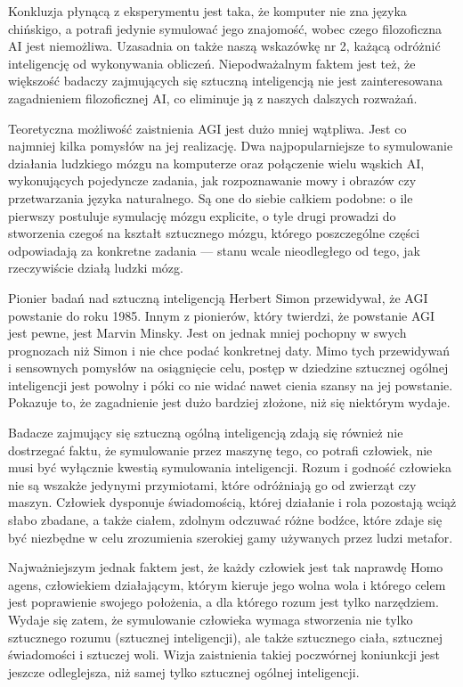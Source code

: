 \documentclass[10pt,a4paper]{article}
\begin{document}
	\par Konkluzja płynącą z eksperymentu jest taka, że komputer nie zna języka chińskigo, a potrafi jedynie symulować jego znajomość, wobec czego filozoficzna AI jest niemożliwa. Uzasadnia on także naszą wskazówkę nr 2, każącą odróżnić inteligencję od wykonywania obliczeń. Niepodważalnym faktem jest też, że większość badaczy zajmujących się sztuczną inteligencją nie jest zainteresowana zagadnieniem filozoficznej AI, co eliminuje ją z naszych dalszych rozważań.
	\par Teoretyczna możliwość zaistnienia AGI jest dużo mniej wątpliwa. Jest co najmniej kilka pomysłów na jej realizację. Dwa najpopularniejsze to symulowanie działania ludzkiego mózgu na komputerze oraz połączenie wielu wąskich AI, wykonujących pojedyncze zadania, jak rozpoznawanie mowy i obrazów czy przetwarzania języka naturalnego. Są one do siebie całkiem podobne: o ile pierwszy postuluje symulację mózgu explicite, o tyle drugi prowadzi do stworzenia czegoś na kształt sztucznego mózgu, którego poszczególne części odpowiadają za konkretne zadania — stanu wcale nieodległego od tego, jak rzeczywiście działą ludzki mózg.
	\par Pionier badań nad sztuczną inteligencją Herbert Simon przewidywał, że AGI powstanie do roku 1985. Innym z pionierów, który twierdzi, że powstanie AGI jest pewne, jest Marvin Minsky. Jest on jednak mniej pochopny w swych prognozach niż Simon i nie chce podać konkretnej daty. Mimo tych przewidywań i sensownych pomysłów na osiągnięcie celu, postęp w dziedzine sztucznej ogólnej inteligencji jest powolny i póki co nie widać nawet cienia szansy na jej powstanie. Pokazuje to, że zagadnienie jest dużo bardziej złożone, niż się niektórym wydaje.
	\par Badacze zajmujący się sztuczną ogólną inteligencją zdają się również nie dostrzegać faktu, że symulowanie przez maszynę tego, co potrafi człowiek, nie musi być wyłącznie kwestią symulowania inteligencji. Rozum i godność człowieka nie są wszakże jedynymi przymiotami, które odróżniają go od zwierząt czy maszyn. Człowiek dysponuje świadomością, której działanie i rola pozostają wciąż słabo zbadane, a także ciałem, zdolnym odczuwać różne bodźce, które zdaje się być niezbędne w celu zrozumienia szerokiej gamy używanych przez ludzi metafor.
	\par Najważniejszym jednak faktem jest, że każdy człowiek jest tak naprawdę Homo agens, człowiekiem działającym, którym kieruje jego wolna wola i którego celem jest poprawienie swojego położenia, a dla którego rozum jest tylko narzędziem. Wydaje się zatem, że symulowanie człowieka wymaga stworzenia nie tylko sztucznego rozumu (sztucznej inteligencji), ale także sztucznego ciała, sztucznej świadomości i sztuczej woli. Wizja zaistnienia takiej poczwórnej koniunkcji jest jeszcze odleglejsza, niż samej tylko sztucznej ogólnej inteligencji.
\end{document}
